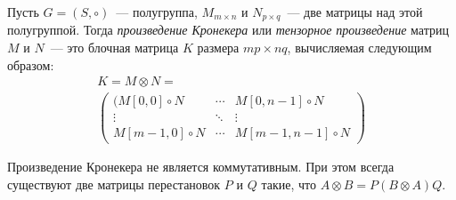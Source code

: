 \begin{definition}
    Пусть $G = (S, \circ)$~--- полугруппа, $M_{m \times n}$ и $N_{p \times q}$~--- две матрицы над этой полугруппой.
    Тогда \emph{произведение Кронекера} или \emph{тензорное произведение} матриц $M$ и $N$~--- это блочная матрица $K$ размера $mp \times nq$, вычисляемая следующим образом:
    \begin{multline*}
        K = M \otimes N = \\
        \begin{pmatrix}
            (M[0,0] \circ N  & \cdots & M[0,n-1] \circ N   \\
            \vdots           & \ddots & \vdots             \\
            M[m-1,0] \circ N & \cdots & M[m-1,n-1] \circ N
        \end{pmatrix}
    \end{multline*}
\end{definition}

\begin{remark}
    \label{note:KronIsNotCommutative}
    Произведение Кронекера не является коммутативным.
    При этом всегда существуют две матрицы перестановок $P$ и $Q$ такие, что $A \otimes B = P(B \otimes A)Q$.
\end{remark}

\begingroup
\newcommand{\examplemtrx}
{
    \begin{pmatrix}
        5  & 6  & 7  & 8  \\
        9  & 10 & 11 & 12 \\
        13 & 14 & 15 & 16
    \end{pmatrix}
}

